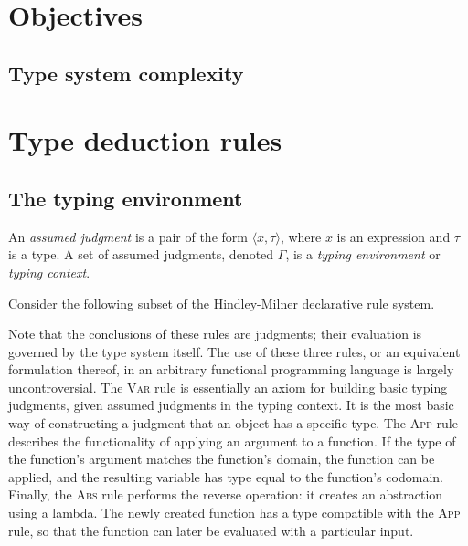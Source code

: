 \documentclass[UKenglish, 11pt, a4paper, parskip=half]{scrbook}
\begin{document}
\section{Objectives}

\subsection{Type system complexity}


\section{Type deduction rules}

\subsection{The typing environment}

\begin{defn}
    An \textit{assumed judgment} is a pair of the form \( \langle x, \tau \rangle \), where \( x \) is an expression and \( \tau \) is a type.
    A set of assumed judgments, denoted \( \Gamma \), is a \textit{typing environment} or \textit{typing context}.
\end{defn}
Consider the following subset of the Hindley-Milner declarative rule system.
Note that the conclusions of these rules are judgments; their evaluation is governed by the type system itself.
The use of these three rules, or an equivalent formulation thereof, in an arbitrary functional programming language is largely uncontroversial.
The \textsc{Var} rule is essentially an axiom for building basic typing judgments, given assumed judgments in the typing context.
It is the most basic way of constructing a judgment that an object has a specific type.
The \textsc{App} rule describes the functionality of applying an argument to a function.
If the type of the function's argument matches the function's domain, the function can be applied, and the resulting variable has type equal to the function's codomain.
Finally, the \textsc{Abs} rule performs the reverse operation: it creates an abstraction using a lambda.
The newly created function has a type compatible with the \textsc{App} rule, so that the function can later be evaluated with a particular input.
\end{document}
